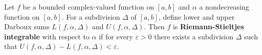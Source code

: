 Let $f$ be a bounded complex-valued function on $[a, b]$ and $\alpha$ a nondecreasing function on $[a, b]$. For a subdivision $\Delta$ of $[a, b]$, define lower and upper Darboux sums $L(f,\alpha,\Delta)$ and $U(f,\alpha,\Delta)$. Then $f$ is \textbf{Riemann-Stieltjes integrable} with respect to $\alpha$ if for every $\varepsilon > 0$ there exists a subdivision $\Delta$ such that $U(f,\alpha,\Delta) - L(f,\alpha,\Delta) < \varepsilon$.
